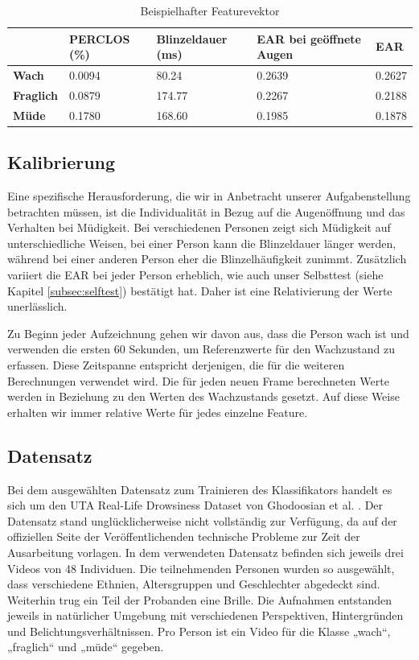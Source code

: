 \begin{table}[!ht]
    \centering
    \begin{tabular}{lllll}

        ~ & \textbf{PERCLOS (\%)} & \textbf{Blinzeldauer (ms)} & \textbf{EAR bei geöffnete Augen} & \textbf{EAR} \\ \hline
        \textbf{Wach} & 0.0094 & 80.24 & 0.2639 & 0.2627 \\ 
        \textbf{Fraglich}& 0.0879 & 174.77 & 0.2267 & 0.2188 \\ 
        \textbf{Müde} & 0.1780 & 168.60 & 0.1985 & 0.1878 \\ 
    \end{tabular}
\caption{Beispielhafter Featurevektor}
\label{table:featurevector}
\end{table}

\subsection{Kalibrierung}
\label{sec:calibration}

Eine spezifische Herausforderung, die wir in Anbetracht unserer Aufgabenstellung betrachten müssen, ist die Individualität in Bezug auf die Augenöffnung und das Verhalten bei Müdigkeit. Bei verschiedenen Personen zeigt sich Müdigkeit auf unterschiedliche Weisen, bei einer Person kann die Blinzeldauer länger werden, während bei einer anderen Person eher die Blinzelhäufigkeit zunimmt. Zusätzlich variiert die EAR bei jeder Person erheblich, wie auch unser Selbsttest (siehe Kapitel \ref{subsec:selftest}) bestätigt hat. Daher ist eine Relativierung der Werte unerlässlich.

Zu Beginn jeder Aufzeichnung gehen wir davon aus, dass die Person wach ist und verwenden die ersten 60 Sekunden, um Referenzwerte für den Wachzustand zu erfassen. Diese Zeitspanne entspricht derjenigen, die für die weiteren Berechnungen verwendet wird. Die für jeden neuen Frame berechneten Werte werden in Beziehung zu den Werten des Wachzustands gesetzt. Auf diese Weise erhalten wir immer relative Werte für jedes einzelne Feature.


\subsection{Datensatz}
Bei dem ausgewählten Datensatz zum Trainieren des Klassifikators handelt es sich um den UTA Real-Life Drowsiness Dataset von Ghodoosian et al. \cite{GH19}. Der Datensatz stand unglücklicherweise nicht vollständig zur Verfügung, da auf der offiziellen Seite der Veröffentlichenden technische Probleme zur Zeit der Ausarbeitung vorlagen. In dem verwendeten Datensatz befinden sich jeweils drei Videos von 48 Individuen. Die teilnehmenden Personen wurden so ausgewählt, dass verschiedene Ethnien, Altersgruppen und Geschlechter abgedeckt sind. Weiterhin trug ein Teil der Probanden eine Brille. Die Aufnahmen entstanden jeweils in natürlicher Umgebung mit verschiedenen Perspektiven, Hintergründen und Belichtungsverhältnissen. Pro Person ist ein Video für die Klasse „wach“, „fraglich“ und „müde“ gegeben. 

